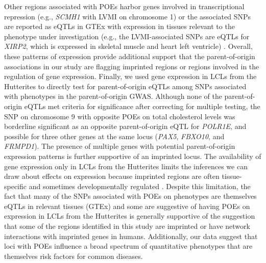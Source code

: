 Other regions associated with POEs harbor genes involved in transcriptional repression (e.g., \emph{SCMH1} with LVMI on chromosome 1) or the associated SNPs are reported as eQTLs in GTEx with expression in tissues relevant to the phenotype under investigation (e.g., the LVMI-associated SNPs are eQTLs for \emph{XIRP2}, which is expressed in skeletal muscle and heart left ventricle) \cite{Consortium2015}. Overall, these patterns of expression provide additional support that the parent-of-origin associations in our study are flagging imprinted regions or regions involved in the regulation of gene expression. Finally, we used gene expression in LCLs from the Hutterites to directly test for parent-of-origin eQTLs among SNPs associated with phenotypes in the parent-of-origin GWAS. Although none of the parent-of-origin eQTLs met criteria for significance after correcting for multiple testing, the SNP on chromosome 9 with opposite POEs on total cholesterol levels was borderline significant as an opposite parent-of-origin eQTL for \emph{POLR1E}, and possible for three other genes at the same locus (\emph{PAX5}, \emph{FBXO10}, and \emph{FRMPD1}). The presence of multiple genes with potential parent-of-origin expression patterns is further supportive of an imprinted locus. The availability of gene expression only in LCLs from the Hutterites limits the inferences we can draw about effects on expression because imprinted regions are often tissue-specific and sometimes developmentally regulated \cite{Peters2014,Falls1999}. Despite this limitation, the fact that many of the SNPs associated with POEs on phenotypes are themselves eQTLs in relevant tissues (GTEx) and some are suggestive of having POEs on expression in LCLs from the Hutterites is generally supportive of the suggestion that some of the regions identified in this study are imprinted or have network interactions with imprinted genes\cite{Chess:2016fs} in humans. Additionally, our data suggest that loci with POEs influence a broad spectrum of quantitative phenotypes that are themselves risk factors for common diseases. 

